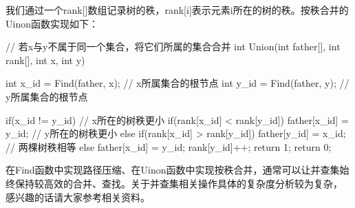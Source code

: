我们通过一个rank[]数组记录树的秩，rank[i]表示元素i所在的树的秩。按秩合并的Uinon函数实现如下：
\begin{cppcode}
    // 若x与y不属于同一个集合，将它们所属的集合合并
    int Union(int father[], int rank[], int x, int y) {
        int x_id = Find(father, x); // x所属集合的根节点
        int y_id = Find(father, y); // y所属集合的根节点

        if(x_id != y_id) {
            // x所在的树秩更小
            if(rank[x_id] < rank[y_id]) {
                father[x_id] = y_id;
            } 
            // y所在的树秩更小
            else if(rank[x_id] > rank[y_id]) {
                father[y_id] = x_id;
            } 
            // 两棵树秩相等
            else {
                father[x_id] = y_id;
                rank[y_id]++;
            }
            return 1;
        }
        return 0;
    }
\end{cppcode}
在Find函数中实现路径压缩、在Uinon函数中实现按秩合并，通常可以让并查集始终保持较高效的合并、查找。关于并查集相关操作具体的复杂度分析较为复杂，
感兴趣的话请大家参考相关资料。


